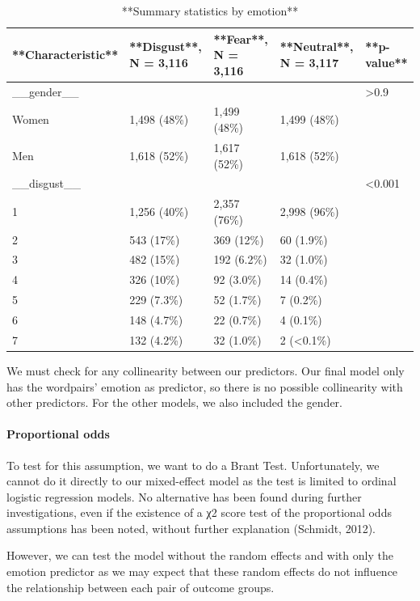 \documentclass[
]{article}
\begin{document}
\begin{table}

\caption{\label{tab:unnamed-chunk-10}**Summary statistics by emotion**}
\centering
\begin{tabular}[t]{l|l|l|l|l}
\hline
**Characteristic** & **Disgust**, N = 3,116 & **Fear**, N = 3,116 & **Neutral**, N = 3,117 & **p-value**\\
\hline
\_\_gender\_\_ &  &  &  & >0.9\\
\hline
Women & 1,498 (48\%) & 1,499 (48\%) & 1,499 (48\%) & \\
\hline
Men & 1,618 (52\%) & 1,617 (52\%) & 1,618 (52\%) & \\
\hline
\_\_disgust\_\_ &  &  &  & <0.001\\
\hline
1 & 1,256 (40\%) & 2,357 (76\%) & 2,998 (96\%) & \\
\hline
2 & 543 (17\%) & 369 (12\%) & 60 (1.9\%) & \\
\hline
3 & 482 (15\%) & 192 (6.2\%) & 32 (1.0\%) & \\
\hline
4 & 326 (10\%) & 92 (3.0\%) & 14 (0.4\%) & \\
\hline
5 & 229 (7.3\%) & 52 (1.7\%) & 7 (0.2\%) & \\
\hline
6 & 148 (4.7\%) & 22 (0.7\%) & 4 (0.1\%) & \\
\hline
7 & 132 (4.2\%) & 32 (1.0\%) & 2 (<0.1\%) & \\
\hline
\end{tabular}
\end{table}

We must check for any collinearity between our predictors. Our final
model only has the wordpairs' emotion as predictor, so there is no
possible collinearity with other predictors. For the other models, we
also included the gender.

\hypertarget{proportional-odds}{%
\paragraph{Proportional odds}\label{proportional-odds}}

To test for this assumption, we want to do a Brant Test. Unfortunately,
we cannot do it directly to our mixed-effect model as the test is
limited to ordinal logistic regression models. No alternative has been
found during further investigations, even if the existence of a χ2 score
test of the proportional odds assumptions has been noted, without
further explanation (Schmidt, 2012).

However, we can test the model without the random effects and with only
the emotion predictor as we may expect that these random effects do not
influence the relationship between each pair of outcome groups.
\end{document}
